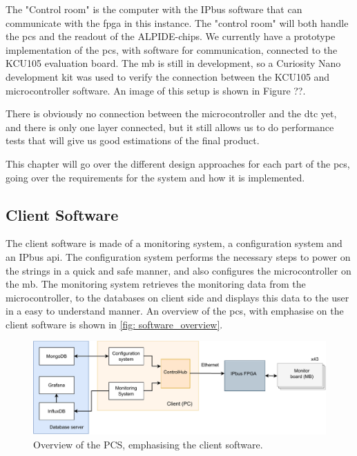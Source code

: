 \documentclass[main.tex]{subfiles}
\begin{document}
The "Control room" is the computer with the IPbus software that can communicate with the \gls{fpga} in this instance. The "control room" will both handle the \gls{pcs} and the readout of the ALPIDE-chips. We currently have a prototype implementation of the \gls{pcs}, with software for communication, connected to the KCU105 evaluation board. The \gls{mb} is still in development, so a Curiosity Nano development kit was used to verify the connection between the KCU105 and microcontroller software. An image of this setup is shown in Figure ??.


There is obviously no connection between the microcontroller and the \gls{dtc} yet, and there is only one layer connected, but it still allows us to do performance tests that will give us good estimations of the final product.

This chapter will go over the different design approaches for each part of the \gls{pcs}, going over the requirements for the system and how it is implemented.

\subsection{Client Software}

The client software is made of a monitoring system, a configuration system and an IPbus \gls{api}. The configuration system performs the necessary steps to power on the strings in a quick and safe manner, and also configures the microcontroller on the \gls{mb}. The monitoring system retrieves the monitoring data from the microcontroller, to the databases on client side and displays this data to the user in a easy to understand manner. An overview of the \gls{pcs}, with emphasise on the client software is shown in \autoref{fig: software_overview}.

\begin{figure}[!htpb]
    \centering
    \includegraphics[width=15cm]{images/PCS overview.pdf}
    \caption{Overview of the PCS, emphasising the client software.}
    \label{fig: software_overview}
\end{figure}
\FloatBarrier
\end{document}
